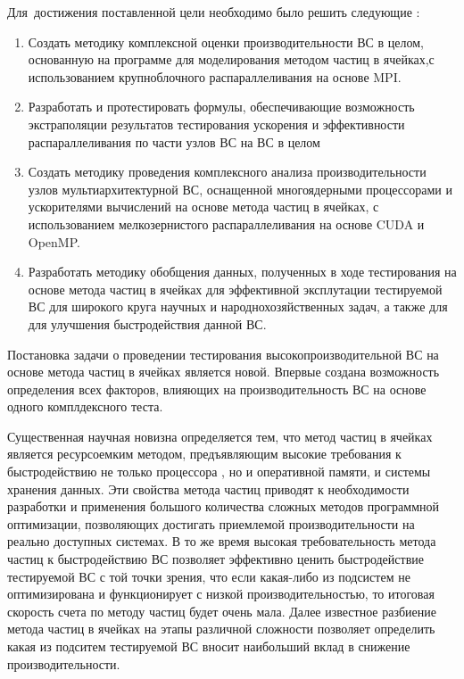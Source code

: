Для~достижения поставленной цели необходимо было решить следующие {\tasks}:
\begin{enumerate}
	\item Создать методику комплексной оценки производительности ВС в целом, основанную на программе для моделирования методом частиц в ячейках,с использованием крупноблочного распараллеливания на основе MPI.
	\item Разработать и протестировать формулы, обеспечивающие возможность экстраполяции результатов тестирования ускорения и эффективности распараллеливания по части узлов ВС на ВС в целом
	\item Создать методику проведения комплексного анализа производительности узлов мультиархитектурной ВС, оснащенной многоядерными процессорами и ускорителями вычислений на основе метода частиц в ячейках, с использованием мелкозернистого распараллеливания на основе CUDA и OpenMP.
	\item Разработать методику обобщения данных, полученных в ходе тестирования на основе метода частиц в ячейках для эффективной эксплутации тестируемой ВС для широкого круга научных и народнохозяйственных задач, а также для для улучшения быстродействия данной ВС. 
\end{enumerate}


{\novelty}
Постановка задачи о проведении тестирования высокопроизводительной ВС на основе метода частиц в ячейках является новой. Впервые создана возможность определения всех факторов, влияющих на производительность ВС на основе одного комплдексного теста. 

Существенная научная новизна определяется тем, что метод частиц в ячейках является ресурсоемким методом, предъявляющим высокие требования к быстродействию не только процессора , но и оперативной памяти, и системы хранения данных. Эти свойства метода частиц приводят к необходимости разработки и применения большого количества сложных методов программной оптимизации, позволяющих достигать приемлемой производительности на реально доступных системах. В то же время высокая требовательность метода частиц к быстродействию ВС позволяет эффективно ценить быстродействие тестируемой ВС с той точки зрения, что если какая-либо из подсистем не оптимизирована и функционирует с низкой производительностью, то итоговая скорость счета по методу частиц будет очень мала. Далее известное разбиение метода частиц в ячейках на этапы различной сложности позволяет определить какая из подситем тестируемой ВС вносит наибольший вклад в снижение производительности. 

